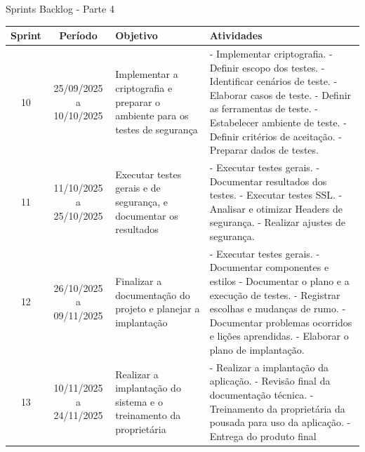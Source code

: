 \documentclass[
	12pt,				%
	openany,			%
	twoside,			%
	a4paper,			%
	english,			%
	french,				%
	spanish,			%
	brazil				%
	]{abntex2}
\begin{document}
\begin{quadro}[H]
	\caption{Sprints Backlog - Parte 4} 
	\label{sprints_backlog_4} 
	\begin{tabular}{|c|c|p{4cm}|p{6cm}|}
		\hline
		\textbf{Sprint} & \textbf{Período} & \textbf{Objetivo} & \textbf{Atividades} \\
		\hline	
		10 & 25/09/2025 a 10/10/2025 & Implementar a criptografia e preparar o ambiente para os testes de segurança &
		- Implementar criptografia. \newline
		- Definir escopo dos testes. \newline
		- Identificar cenários de teste. \newline
		- Elaborar casos de teste. \newline
		- Definir as ferramentas de teste. \newline
		- Estabelecer ambiente de teste. \newline
		- Definir critérios de aceitação. \newline
		- Preparar dados de testes. \\
		\hline	
		11 & 11/10/2025 a 25/10/2025 & Executar testes gerais e de segurança, e documentar os resultados &
		- Executar testes gerais. \newline
		- Documentar resultados dos testes. \newline
		- Executar testes SSL. \newline
		- Analisar e otimizar Headers de segurança. \newline
		- Realizar ajustes de segurança. \\
		\hline
		12 & 26/10/2025 a 09/11/2025 & Finalizar a documentação do projeto e planejar a implantação &
		- Executar testes gerais. \newline
		- Documentar componentes e estilos \newline
		- Documentar o plano e a execução de testes. \newline
		- Registrar escolhas e mudanças de rumo. \newline
		- Documentar problemas ocorridos e lições aprendidas. \newline
		- Elaborar o plano de implantação.	\\
		\hline
		13 & 10/11/2025 a 24/11/2025 & Realizar a implantação do sistema e o treinamento da proprietária &
		- Realizar a implantação da aplicação. \newline
		- Revisão final da documentação técnica. \newline
		- Treinamento da proprietária da pousada para uso da aplicação. \newline
		- Entrega do produto final \\
\hline
\end{tabular}
\end{quadro}
\end{document}
